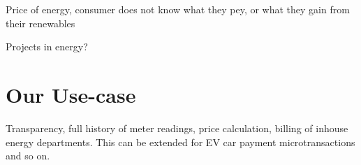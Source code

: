 Price of energy, consumer does not know what they pey, or what they gain from their renewables

Projects in energy?


\section{Our Use-case}
Transparency, full history of meter readings, price calculation, billing of inhouse energy departments. This can be extended for EV car payment microtransactions and so on.